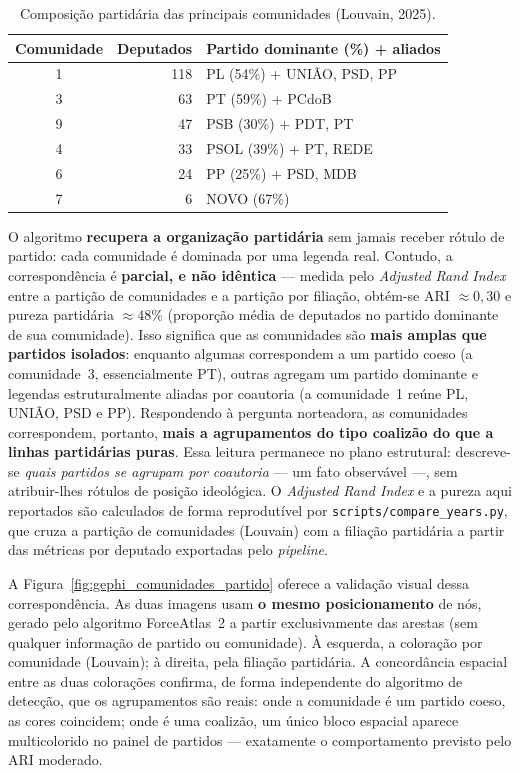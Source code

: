 \documentclass[
      12pt,
      a4paper,
      openright,
      oneside,
      chapter=TITLE,
      section=TITLE,
      english,
      french,
      spanish,
      brazilian
    ]{abntex2}
\begin{document}
    \begin{table}[H]
    \centering
    \caption{Composição partidária das principais comunidades (Louvain, 2025).}
    \label{tab:comunidade_partido}
    \begin{tabular}{crl}
    \toprule
    \textbf{Comunidade} & \textbf{Deputados} & \textbf{Partido dominante (\%) + aliados} \\
    \midrule
    1 & 118 & PL (54\%) + UNIÃO, PSD, PP \\
    3 & 63  & PT (59\%) + PCdoB \\
    9 & 47  & PSB (30\%) + PDT, PT \\
    4 & 33  & PSOL (39\%) + PT, REDE \\
    6 & 24  & PP (25\%) + PSD, MDB \\
    7 & 6   & NOVO (67\%) \\
    \bottomrule
    \end{tabular}
    \end{table}
    
    
    
    O algoritmo \textbf{recupera a organização partidária} sem jamais receber rótulo de partido: cada comunidade é dominada por uma legenda real. Contudo, a correspondência é \textbf{parcial, e não idêntica} --- medida pelo \textit{Adjusted Rand Index} entre a partição de comunidades e a partição por filiação, obtém-se ARI $\approx 0{,}30$ e pureza partidária $\approx 48\%$ (proporção média de deputados no partido dominante de sua comunidade). Isso significa que as comunidades são \textbf{mais amplas que partidos isolados}: enquanto algumas correspondem a um partido coeso (a comunidade~3, essencialmente PT), outras agregam um partido dominante e legendas estruturalmente aliadas por coautoria (a comunidade~1 reúne PL, UNIÃO, PSD e PP). Respondendo à pergunta norteadora, as comunidades correspondem, portanto, \textbf{mais a agrupamentos do tipo coalizão do que a linhas partidárias puras}. Essa leitura permanece no plano estrutural: descreve-se \emph{quais partidos se agrupam por coautoria} --- um fato observável ---, sem atribuir-lhes rótulos de posição ideológica. O \textit{Adjusted Rand Index} e a pureza aqui reportados são calculados de forma reprodutível por \texttt{scripts/compare\_years.py}, que cruza a partição de comunidades (Louvain) com a filiação partidária a partir das métricas por deputado exportadas pelo \textit{pipeline}.
    
    A Figura~\ref{fig:gephi_comunidades_partido} oferece a validação visual dessa correspondência. As duas imagens usam \textbf{o mesmo posicionamento} de nós, gerado pelo algoritmo ForceAtlas~2 a partir exclusivamente das arestas (sem qualquer informação de partido ou comunidade). À esquerda, a coloração por comunidade (Louvain); à direita, pela filiação partidária. A concordância espacial entre as duas colorações confirma, de forma independente do algoritmo de detecção, que os agrupamentos são reais: onde a comunidade é um partido coeso, as cores coincidem; onde é uma coalizão, um único bloco espacial aparece multicolorido no painel de partidos --- exatamente o comportamento previsto pelo ARI moderado.
    
\end{document}
